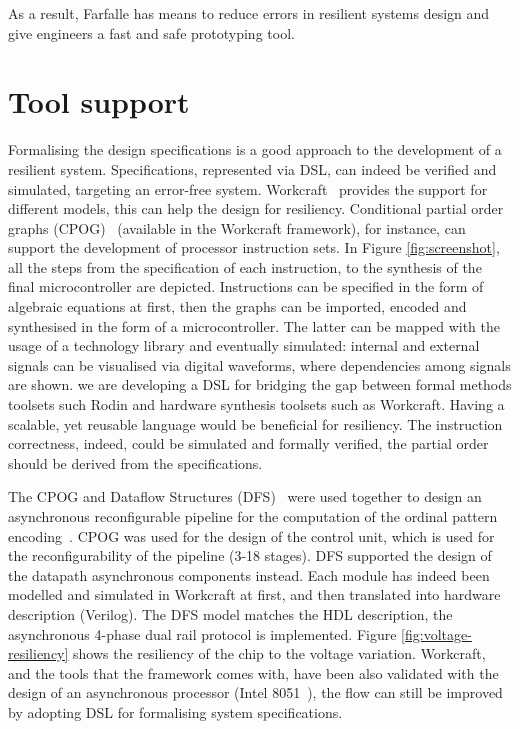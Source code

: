 \documentclass[conference]{IEEEtran}
\begin{document}
As a result, Farfalle has means to reduce errors in resilient systems design
and give engineers a fast and safe prototyping tool.

\section{Tool support\label{sec:tools}}

Formalising the design specifications is a good approach to the development of a resilient
system. Specifications, represented via DSL, can indeed be verified and
simulated, targeting an error-free system. Workcraft~\cite{workcraft_web} provides the support for different
models, this can help the design for resiliency. Conditional partial order graphs (CPOG)~\cite{ISA-formal}
(available in the Workcraft framework), for instance, can support the development of
processor instruction sets. In Figure \ref{fig:screenshot}, all the steps from the
specification of each instruction, to the synthesis of the final microcontroller are
depicted. Instructions can be specified in the form of algebraic equations at first, then the
graphs can be imported, encoded and synthesised in the form of a microcontroller. The latter
can be mapped with the usage of a technology library and eventually simulated: internal and
external signals can be visualised via digital waveforms, where dependencies among signals
are shown. we are developing a DSL for bridging the gap between formal methods toolsets such
Rodin and hardware synthesis toolsets such as Workcraft. Having a scalable, yet
reusable language would be beneficial for resiliency. The instruction correctness, indeed,
could be simulated and formally verified, the partial order should be derived from the
specifications.

The CPOG and Dataflow Structures (DFS)~\cite{DFS} were used together to design an asynchronous
reconfigurable pipeline for the computation of the ordinal pattern encoding~\cite{OPE}. CPOG was used
for the design of the control unit, which is used for the reconfigurability of the pipeline
(3-18 stages). DFS supported the design of the datapath asynchronous components instead. Each
module has indeed been modelled and simulated in Workcraft at first, and then translated into
hardware description (Verilog). The DFS model matches the HDL description, the asynchronous
4-phase dual rail protocol is implemented. Figure \ref{fig:voltage-resiliency} shows the
resiliency of the chip to the voltage variation. Workcraft, and the tools that the framework
comes with, have been also validated with the design of an asynchronous processor (Intel
8051~\cite{rec-proc}), the flow can still be improved by adopting DSL for formalising system
specifications.
\end{document}
